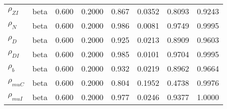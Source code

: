 \begin{center}
\begin{longtable}{llcccccc}
${\rho_{ZI}}$ & beta &   0.600 & 0.2000 &   0.867& 0.0352 &  0.8093 &  0.9243 \\ 
${\rho_N}$ & beta &   0.600 & 0.2000 &   0.986& 0.0081 &  0.9749 &  0.9995 \\ 
${\rho_D}$ & beta &   0.600 & 0.2000 &   0.925& 0.0213 &  0.8909 &  0.9603 \\ 
${\rho_{DI}}$ & beta &   0.600 & 0.2000 &   0.985& 0.0101 &  0.9704 &  0.9995 \\ 
${\rho_b}$ & beta &   0.600 & 0.2000 &   0.932& 0.0219 &  0.8962 &  0.9664 \\ 
${\rho_{muC}}$ & beta &   0.600 & 0.2000 &   0.804& 0.1952 &  0.4738 &  0.9976 \\ 
${\rho_{muI}}$ & beta &   0.600 & 0.2000 &   0.977& 0.0246 &  0.9377 &  1.0000 \\ 
\end{longtable}
 \end{center}
